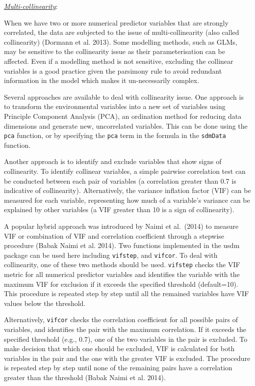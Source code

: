 \documentclass[
]{article}
\begin{document}
\uline{\textit{Multi-collinearity}}:

When we have two or more numerical predictor variables that are strongly
correlated, the data are subjected to the issue of multi-collinearity
(also called collinearity) (Dormann et al. 2013). Some modelling
methods, such as GLMs, may be sensitive to the collinearity issue as
their parameterisation can be affected. Even if a modelling method is
not sensitive, excluding the collinear variables is a good practice
given the parsimony rule to avoid redundant information in the model
which makes it un-necessarily complex.

Several approaches are available to deal with collinearity issue. One
approach is to transform the environmental variables into a new set of
variables using Principle Component Analysis (PCA), an ordination method
for reducing data dimensions and generate new, uncorrelated variables.
This can be done using the \texttt{pca} function, or by specifying the
\texttt{pca} term in the formula in the \texttt{sdmData} function.

Another approach is to identify and exclude variables that show signs of
collinearity. To identify collinear variables, a simple pairwise
correlation test can be conducted between each pair of variables (a
correlation greater than 0.7 is indicative of collinearity).
Alternatively, the variance inflation factor (VIF) can be measured for
each variable, representing how much of a variable's variance can be
explained by other variables (a VIF greater than 10 is a sign of
collinearity).

A popular hybrid approach was introduced by Naimi et al.~(2014) to
measure VIF or combination of VIF and correlation coefficient through a
stepwise procedure (Babak Naimi et al. 2014). Two functions implemented
in the usdm package can be used here including \texttt{vifstep}, and
\texttt{vifcor}. To deal with collinearity, one of these two methods
should be used. \texttt{vifstep} checks the VIF metric for all numerical
predictor variables and identifies the variable with the maximum VIF for
exclusion if it exceeds the specified threshold (default=10). This
procedure is repeated step by step until all the remained variables have
VIF values below the threshold.

Alternatively, \texttt{vifcor} checks the correlation coefficient for
all possible pairs of variables, and identifies the pair with the
maximum correlation. If it exceeds the specified threshold (e.g., 0.7),
one of the two variables in the pair is excluded. To make decision that
which one should be excluded, VIF is calculated for both variables in
the pair and the one with the greater VIF is excluded. The procedure is
repeated step by step until none of the remaining pairs have a
correlation greater than the threshold (Babak Naimi et al. 2014).
\end{document}
